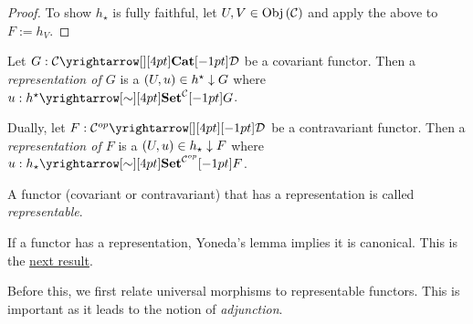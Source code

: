 \begin{proof}
  To show $h_\star$ is fully faithful, 
  let $U, V \in \mathrm{Obj}\left(\mathcal{C}\right)$ and apply the above to $F := h_V$.
\end{proof}

\begin{dfn}
  \hypertarget{rep}{}
  
  Let $G : \map{\CC}{\DD}{\CAT}{}$ be a covariant functor. 
  Then a \emph{representation of $G$} is a $(U,u) \in h^\star\downarrow G$
  where $u : \map{h^\star}{G}{\SET^\CC}{\sim}$.

  Dually, let $F : \map{\CC\op}{\DD}{}{}$ be a contravariant functor. 
  Then a \emph{representation of $F$} is a $(U,u) \in h_\star\downarrow F$
  where $u : \map{h_\star}{F}{\SET^{\CC\op}}{\sim}$.

  A functor (covariant or contravariant) that has a representation is called 
  \emph{representable}.
\end{dfn}

\begin{rmk}
  If a functor has a representation,
  Yoneda's lemma implies it is canonical.
  This is the \hyperlink{canonical_rep}{next result}. 

  Before this, we first relate universal morphisms to representable functors.
  This is important as it leads to the notion of \emph{adjunction}. 
\end{rmk}

